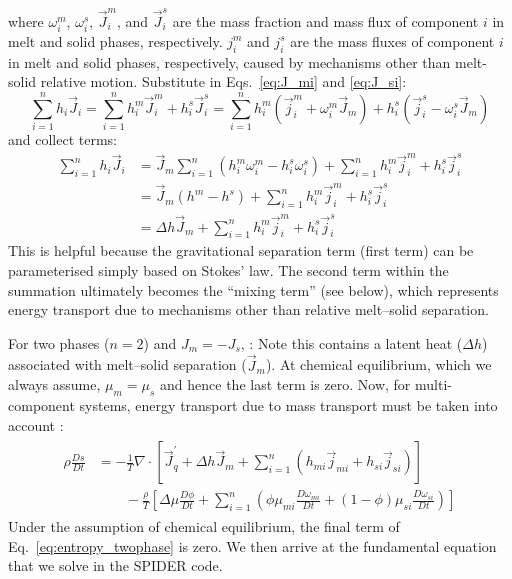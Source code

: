 where $\omega_i^m$, $\omega_i^s$, $\vec{J}_i^m$, and $\vec{J}_i^s$ are the mass fraction and mass flux of component $i$ in melt and solid phases, respectively.  $j_i^m$ and $j_i^s$ are the mass fluxes of component $i$ in melt and solid phases, respectively, caused by mechanisms other than melt-solid relative motion.  Substitute in Eqs.~\ref{eq:J_mi} and \ref{eq:J_si}:
\begin{equation}
\sum_{i=1}^n h_i\vec{J}_i = \sum_{i=1}^n h_i^m \vec{J}_i^m + h_i^s \vec{J}_i^s =  \sum_{i=1}^n h_i^m \left( \vec{j}_i^m + \omega_i^m \vec{J}_m \right) + h_i^s \left( \vec{j}_i^s - \omega_i^s \vec{J}_m \right)
\end{equation}
and collect terms:
\begin{align}
\sum_{i=1}^n h_i\vec{J}_i &= \vec{J}_m \sum_{i=1}^n \left( h_i^m \omega_i^m - h_i^s \omega_i^s \right) + \sum_{i=1}^n h_i^m \vec{j}_i^m + h_i^s \vec{j}_i^s\\
&= \vec{J}_m \left( h^m - h^s \right) + \sum_{i=1}^n h_i^m \vec{j}_i^m + h_i^s \vec{j}_i^s\\
&= \Delta h \vec{J}_m + \sum_{i=1}^n h_i^m \vec{j}_i^m + h_i^s \vec{j}_i^s
\end{align}
This is helpful because the gravitational separation term (first term) can be parameterised simply based on Stokes' law.  The second term within the summation ultimately becomes the ``mixing term'' (see below), which represents energy transport due to mechanisms other than relative melt--solid separation.

For two phases ($n=2$) and $J_m=-J_s$, :
Note this contains a latent heat ($\Delta h$) associated with melt--solid separation ($\vec{J}_m$).  At chemical equilibrium, which we always assume, $\mu_m=\mu_s$ and hence the last term is zero.  Now, for multi-component systems, energy transport due to mass transport must be taken into account :
\begin{align}
\begin{split}
\rho \frac{Ds}{Dt} &= -\frac{1}{T} \nabla \cdot \left[ \vec{J}_q^\prime + \Delta h \vec{J}_m + \sum_{i=1}^n (h_{mi} \vec{j}_{mi} + h_{si} \vec{j}_{si} ) \right]\\
&\qquad -\frac{\rho}{T} \left[ \Delta \mu \frac{D\phi}{Dt} + \sum_{i=1}^n \left( \phi \mu_{mi}\frac{D\omega_{mi}}{Dt} + (1-\phi) \mu_{si} \frac{D\omega_{si}}{Dt} \right) \right]
\end{split}
\end{align}
Under the assumption of chemical equilibrium, the final term of Eq.~\ref{eq:entropy_twophase} is zero.  We then arrive at the fundamental equation that we solve in the SPIDER code.

